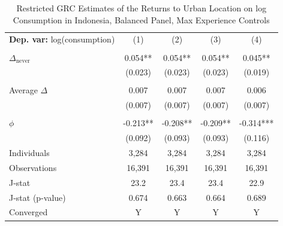 \begin{table}[htbp] \centering \begin{threeparttable}
 \caption{Restricted GRC Estimates of the Returns to Urban Location on log Consumption in Indonesia, Balanced Panel, Max Experience Controls} 
 \label{tab:GRC_IDN_consumption_urban_bal_exp_max} 
\begin{tabular}{l cccc} \toprule  \textbf{Dep. var:}  log(consumption) 
                    &\multicolumn{1}{c}{(1)}   &\multicolumn{1}{c}{(2)}   &\multicolumn{1}{c}{(3)}   &\multicolumn{1}{c}{(4)}   \\
                    &               &               &               &               \\
\addlinespace
$\Delta_{\text{never}}$&       0.054** &       0.054** &       0.054** &       0.045** \\
                    &     (0.023)   &     (0.023)   &     (0.023)   &     (0.019)   \\
                    &               &               &               &               \\
\addlinespace
Average $\Delta$    &       0.007   &       0.007   &       0.007   &       0.006   \\
                    &     (0.007)   &     (0.007)   &     (0.007)   &     (0.007)   \\
                    &               &               &               &               \\
\addlinespace
$\phi$              &      -0.213** &      -0.208** &      -0.209** &      -0.314***\\
                    &     (0.092)   &     (0.093)   &     (0.093)   &     (0.116)   \\
\addlinespace
Individuals         &       3,284   &       3,284   &       3,284   &       3,284   \\
Observations        &      16,391   &      16,391   &      16,391   &      16,391   \\
J-stat              &        23.2   &        23.4   &        23.4   &        22.9   \\
J-stat (p-value)    &       0.674   &       0.663   &       0.664   &       0.689   \\
Converged           &           Y   &           Y   &           Y   &           Y   \\

\end{tabular}
\end{threeparttable}
\end{table}
